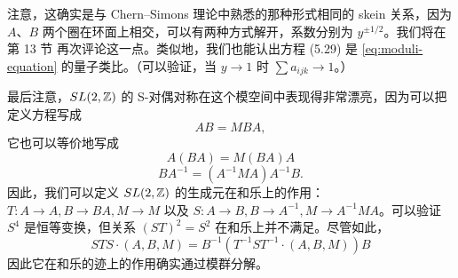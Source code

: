 注意，这确实是与 Chern--Simons 理论中熟悉的那种形式相同的 skein 关系，因为 $A$、$B$ 两个圈在环面上相交，可以有两种方式解开，系数分别为 $y^{\pm 1/2}$。我们将在第 13 节%
再次评论这一点。类似地，我们也能认出方程 (5.29)%
是 \eqref{eq:moduli-equation} 的量子类比。（可以验证，当 $y\to 1$ 时 $\sum a_{ijk}\to 1$。）

最后注意，$SL(2,\mathbb{Z})$ 的 S-对偶对称在这个模空间中表现得非常漂亮，因为可以把定义方程写成
\begin{equation}
A B = M B A,
\end{equation}
它也可以等价地写成
\begin{equation}
A (B A) = M (B A) A
\end{equation}
\begin{equation}
B A^{-1} = (A^{-1} M A) A^{-1} B.
\end{equation}
因此，我们可以定义 $SL(2,\mathbb{Z})$ 的生成元在和乐上的作用：$T: A \to A, B\to B A, M\to M$ 以及 $S: A \to B, B\to A^{-1}, M\to A^{-1} M A$。可以验证 $S^4$ 是恒等变换，但关系 $(ST)^2= S^2$ 在和乐上并不满足。尽管如此，
\begin{equation}
STS\cdot (A,B,M) = B^{-1}\left( T^{-1} S T^{-1} \cdot (A,B,M) \right) B
\end{equation}
因此它在和乐的迹上的作用确实通过模群分解。
